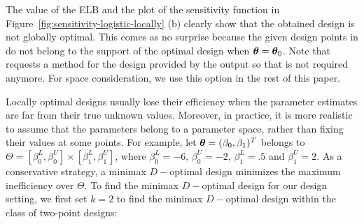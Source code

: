 The value of the ELB and the plot of the sensitivity function in Figure~\ref{fig:sensitivity-logistic-locally} (b) clearly  show that the obtained design is not  globally optimal. This comes as no surprise because the given design points in  do not belong to the  support of the optimal design when $\boldsymbol{\theta} = \boldsymbol{\theta}_0$.
Note that  requests a  method for the design provided by the output  so that  is not required anymore. For space consideration, we use this option in the rest of this paper.


Locally optimal designs usually lose their efficiency  when the parameter estimates are far from their true unknown values.
Moreover, in practice, it is more realistic to assume that the parameters belong to a  parameter space, rather than fixing their values at some points. For example, let    $\boldsymbol{\theta} = (\beta_0, \beta_1)^T$ belongs to $\Theta = [\beta_0^L, \beta_0^U] \times [\beta_1^L, \beta_1^U]$, where $\beta_0^L = -6$,  $\beta_0^U = -2$, $\beta_1^L = .5$ and $\beta_1^U = 2$.
As  a conservative strategy, a  minimax $D-$optimal design   minimizes the maximum inefficiency over $\Theta$.
To find the minimax $D-$optimal design for our design setting, we first set $k = 2$ to find  the minimax $D-$optimal design within the class of two-point designs:
